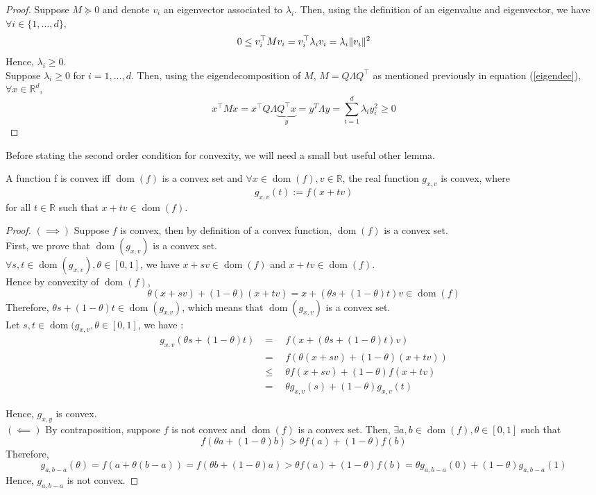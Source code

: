 \documentclass{article}
\DeclareMathOperator*{\dom}{dom}
\newcommand{\R}{\mathbb{R}}
\DeclarePairedDelimiter{\norm}{\lVert}{\rVert}
\begin{document}
\begin{proof}
Suppose $M\succeq 0$ and denote $v_i$ an eigenvector associated to $\lambda_i$. Then, using the definition of an eigenvalue and eigenvector, we have $\forall i \in \{1,\ldots,d\},$
\[
0 \leq v_i^\top M v_i = v_i^\top \lambda_i v_i =\lambda_i \norm{v_i}^2
\]
Hence, $\lambda_i\geq 0$.\\

Suppose $\lambda_i \geq 0$ for $i=1,\ldots,d$. Then, using the eigendecomposition of $M$, $M=Q \Lambda Q^\top$ as mentioned previously in equation (\ref{eigendec}), $\forall x \in \R^d$,
\[
    x^\top M x = x^\top Q \Lambda \underbrace{Q^\top x}_{y} = y^T \Lambda y = \sum_{i=1}^d \lambda_i y_i^2\geq 0
\]
\end{proof}

Before stating the second order condition for convexity, we will need a small but useful other lemma.

\begin{lemma}\label{line}
A function f is convex iff $\dom(f)$ is a convex set and $\forall x \in \dom(f), v\in\R$, the real function $g_{x,v}$ is convex, where
$$g_{x,v}(t):=f(x+tv)$$
for all $t\in \R$ such that $x+tv\in\dom(f)$.
\end{lemma}{}

\begin{proof}
$(\implies)$ Suppose $f$ is convex, then by definition of a convex function, $\dom(f)$ is a convex set.\\

First, we prove that $\dom(g_{x,v})$ is a convex set.\\

$\forall s,t\in \dom(g_{x,v}), \theta\in[0,1]$, we have $x+sv\in\dom(f)$ and $x+tv\in\dom(f)$.\\

Hence by convexity of $\dom(f)$,
\[\theta (x+sv) + (1-\theta)(x+tv)=x+(\theta s + (1-\theta)t)v \in\dom(f)\]
Therefore, $\theta s + (1-\theta)t\in\dom(g_{x.v})$, which means that $\dom(g_{x,v})$ is a convex set.\\

Let $s,t\in\dom(g_{x,v},\theta\in[0,1]$, we have :
\begin{align*}
g_{x,v}(\theta s+(1-\theta) t) &=\quad f(x+(\theta s+(1-\theta) t)v)\\
&=\quad f(\theta(x+sv)+(1-\theta)(x+tv))\\
&\leq\quad \theta f(x+sv) + (1-\theta)f(x+tv)\\
&=\quad\theta g_{x,v}(s) + (1-\theta)g_{x,v}(t) 
\end{align*}

Hence, $g_{x,y}$ is convex.\\

$(\impliedby)$ By contraposition, suppose $f$ is not convex and $\dom(f)$ is a convex set. Then, $\exists a,b \in \dom(f), \theta \in [0,1]$ such that $$f(\theta a + (1-\theta)b)>\theta f(a) + (1-\theta)f(b)$$
Therefore,
\[
 g_{a,b-a}(\theta) = f(a+\theta (b-a)) = f(\theta b + (1-\theta)a) > \theta f(a) + (1-\theta)f(b)=\theta g_{a,b-a}(0) + (1-\theta) g_{a,b-a}(1)
\]
Hence, $g_{a,b-a}$ is not convex.

\end{proof}{}
\end{document}
